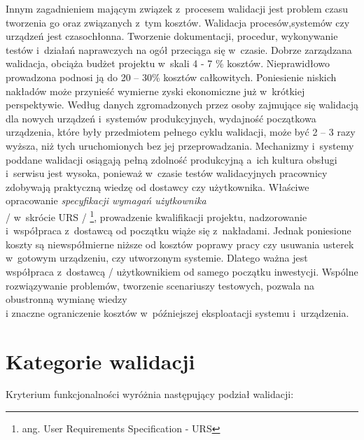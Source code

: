 \documentclass[brudnopis]{xmgr}
\begin{document}
\indent \textcolor{sb}{Innym zagadnieniem mającym związek z~procesem walidacji jest problem czasu tworzenia go oraz związanych z~tym kosztów.} \textcolor{sa}{Walidacja procesów,systemów czy urządzeń jest czasochłonna. Tworzenie dokumentacji, procedur, wykonywanie testów i~działań naprawczych na ogół przeciąga się w~czasie.} \textcolor{sb}{Dobrze zarządzana walidacja, obciąża budżet projektu w~skali 4 - 7 \% kosztów.} \textcolor{sa}{Nieprawidłowo prowadzona podnosi ją do 20 – 30\% kosztów całkowitych.} \textcolor{sb}{Poniesienie niskich nakładów może przynieść wymierne zyski ekonomiczne już w~krótkiej perspektywie.} \textcolor{sa}{Według danych zgromadzonych przez osoby zajmujące się walidacją dla nowych urządzeń i~systemów produkcyjnych, wydajność początkowa urządzenia, które były przedmiotem pełnego cyklu walidacji, może być 2 – 3 razy wyższa, niż tych uruchomionych bez jej przeprowadzania.} \textcolor{sb}{Mechanizmy i~systemy poddane walidacji osiągają pełną zdolność produkcyjną a~ich kultura obsługi i~serwisu jest wysoka,} \textcolor{sa}{ponieważ w~czasie testów walidacyjnych pracownicy zdobywają praktyczną wiedzę od dostawcy czy użytkownika.} \textcolor{sb}{Właściwe opracowanie \textit{specyfikacji wymagań użytkownika}
\\
/ w~skrócie URS / \footnote{ang. User Requirements Specification - URS}, prowadzenie kwalifikacji projektu, nadzorowanie i~współpraca z~dostawcą} \textcolor{sa}{od początku wiąże się z~nakładami.} \textcolor{sb}{Jednak poniesione koszty są niewspółmierne niższe od kosztów poprawy pracy czy usuwania usterek w~gotowym urządzeniu, czy utworzonym systemie.} \textcolor{sa}{Dlatego ważna jest współpraca z~dostawcą / użytkownikiem  od samego początku inwestycji.} \textcolor{sb}{Wspólne rozwiązywanie problemów, tworzenie scenariuszy testowych,} \textcolor{sa}{pozwala na obustronną wymianę wiedzy
\\
i znaczne ograniczenie kosztów w~późniejszej eksploatacji systemu i~urządzenia.}\cite{ekonomia}

\section{Kategorie walidacji}

\textcolor{sb}{Kryterium funkcjonalności wyróżnia następujący podział walidacji:}
\end{document}
